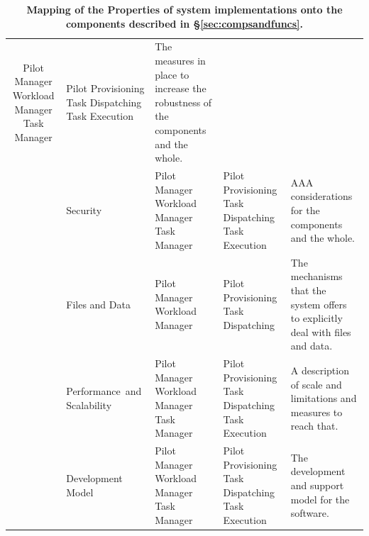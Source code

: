 \documentclass{sig-alternate}
\begin{document}
\begin{table}
\begin{tabular}{c|p{3.6cm}|p{2.7cm}|p{2.7cm}|p{5cm}|}
Pilot Manager      \newline
  Workload Manager \newline
  Task Manager                       &
Pilot Provisioning \newline
  Task Dispatching \newline
  Task Execution                     &
The measures in place to increase the robustness of the components and the
whole.\\
\cline{2-5}
                                     &
Security                             &
Pilot Manager      \newline
  Workload Manager \newline
  Task Manager                       &
Pilot Provisioning \newline
  Task Dispatching \newline
  Task Execution                     &
AAA considerations for the components and the whole.\\
\cline{2-5}
                                     &
Files and Data                       &
Pilot Manager      \newline
   Workload Manager                  &
Pilot Provisioning \newline
  Task Dispatching                   &
The mechanisms that the system offers to explicitly deal with files and data.\\
\cline{2-5}
                                     &
Performance~and    \newline
  Scalability                        &
Pilot Manager      \newline
  Workload Manager \newline
  Task Manager                       &
Pilot Provisioning \newline
  Task Dispatching \newline
  Task Execution                     &
A description of scale and limitations and measures to reach that.\\
\cline{2-5}
                                     &
Development Model                    &
Pilot Manager      \newline
  Workload Manager \newline
  Task Manager                       &
Pilot Provisioning \newline
  Task Dispatching \newline
  Task Execution                     &
The development and support model for the software.\\
\hline
\end{tabular}
\caption{\textbf{Mapping of the Properties of \pilot system implementations
onto the components described in \S\ref{sec:compsandfuncs}.}}
\label{table:property_component_mapping}
\end{table}
\end{document}
